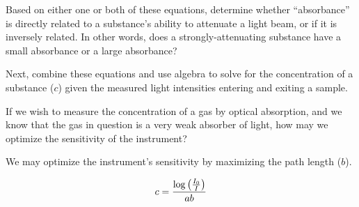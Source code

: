 Based on either one or both of these equations, determine whether ``absorbance'' is directly related to a substance's ability to attenuate a light beam, or if it is inversely related.  In other words, does a strongly-attenuating substance have a small absorbance or a large absorbance?

Next, combine these equations and use algebra to solve for the concentration of a substance ($c$) given the measured light intensities entering and exiting a sample.

\vskip 10pt

If we wish to measure the concentration of a gas by optical absorption, and we know that the gas in question is a very weak absorber of light, how may we optimize the sensitivity of the instrument?







We may optimize the instrument's sensitivity by maximizing the path length ($b$).

\vskip 10pt

$$c = {\log \left( {I_0 \over I} \right) \over ab}$$











